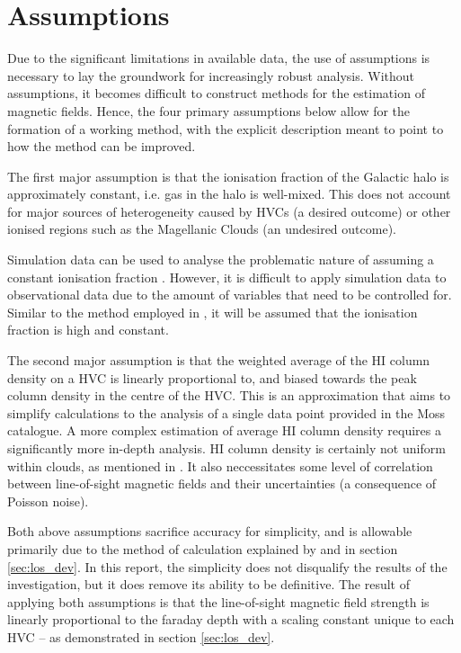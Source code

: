 \section{Assumptions}
\label{sec:assumptions}

Due to the significant limitations in available data, the use of assumptions is necessary to lay the groundwork for increasingly robust analysis. Without assumptions, it becomes difficult to construct methods for the estimation of magnetic fields. Hence, the four primary assumptions below allow for the formation of a working method, with the explicit description meant to point to how the method can be improved.


The first major assumption is that the ionisation fraction of the Galactic halo is approximately constant, i.e. gas in the halo is well-mixed. This does not account for major sources of heterogeneity caused by HVCs (a desired outcome) or other ionised regions such as the Magellanic Clouds (an undesired outcome).


Simulation data can be used to analyse the problematic nature of assuming a constant ionisation fraction \citep{ID23}. However, it is difficult to apply simulation data to observational data due to the amount of variables that need to be controlled for. Similar to the method employed in \cite{ID23}, it will be assumed that the ionisation fraction is high and constant.


The second major assumption is that the weighted average of the HI column density on a HVC is linearly proportional to, and biased towards the peak column density in the centre of the HVC. This is an approximation that aims to simplify calculations to the analysis of a single data point provided in the Moss catalogue. A more complex estimation of average HI column density requires a significantly more in-depth analysis. HI column density is certainly not uniform within clouds, as mentioned in \cite{ID69}. It also neccessitates some level of correlation between line-of-sight magnetic fields and their uncertainties (a consequence of Poisson noise).


Both above assumptions sacrifice accuracy for simplicity, and is allowable primarily due to the method of calculation explained by \cite{ID27} and in section \ref{sec:los_dev}. In this report, the simplicity does not disqualify the results of the investigation, but it does remove its ability to be definitive. The result of applying both assumptions is that the line-of-sight magnetic field strength is linearly proportional to the faraday depth with a scaling constant unique to each HVC – as demonstrated in section \ref{sec:los_dev}.


